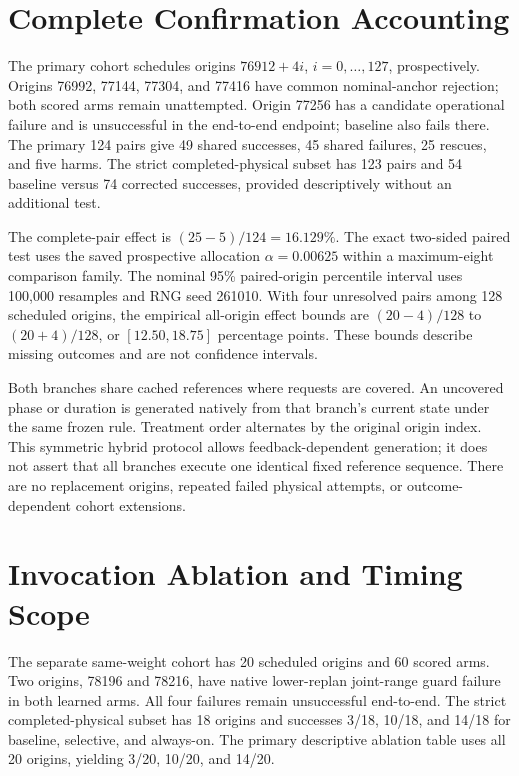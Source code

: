 \section{Complete Confirmation Accounting}
The primary cohort schedules origins $76912+4i$, $i=0,\ldots,127$, prospectively. Origins 76992, 77144, 77304, and 77416 have common nominal-anchor rejection; both scored arms remain unattempted. Origin 77256 has a candidate operational failure and is unsuccessful in the end-to-end endpoint; baseline also fails there. The primary 124 pairs give 49 shared successes, 45 shared failures, 25 rescues, and five harms. The strict completed-physical subset has 123 pairs and 54 baseline versus 74 corrected successes, provided descriptively without an additional test.

The complete-pair effect is $(25-5)/124=16.129\%$. The exact two-sided paired test uses the saved prospective allocation $\alpha=0.00625$ within a maximum-eight comparison family. The nominal 95\% paired-origin percentile interval uses 100,000 resamples and RNG seed 261010. With four unresolved pairs among 128 scheduled origins, the empirical all-origin effect bounds are $(20-4)/128$ to $(20+4)/128$, or $[12.50,18.75]$ percentage points. These bounds describe missing outcomes and are not confidence intervals.

Both branches share cached references where requests are covered. An uncovered phase or duration is generated natively from that branch's current state under the same frozen rule. Treatment order alternates by the original origin index. This symmetric hybrid protocol allows feedback-dependent generation; it does not assert that all branches execute one identical fixed reference sequence. There are no replacement origins, repeated failed physical attempts, or outcome-dependent cohort extensions.

\section{Invocation Ablation and Timing Scope}
The separate same-weight cohort has 20 scheduled origins and 60 scored arms. Two origins, 78196 and 78216, have native lower-replan joint-range guard failure in both learned arms. All four failures remain unsuccessful end-to-end. The strict completed-physical subset has 18 origins and successes 3/18, 10/18, and 14/18 for baseline, selective, and always-on. The primary descriptive ablation table uses all 20 origins, yielding 3/20, 10/20, and 14/20.

